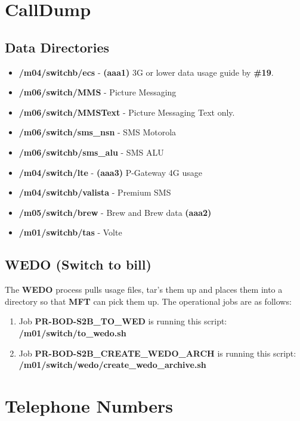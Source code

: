 \documentclass[12pt,twoside]{article}
\begin{document}
\section{CallDump}
\label{sec:orgheadline166}
\subsection{Data Directories}
\label{sec:orgheadline164}
\begin{itemize}
\item \textbf{/m04/switchb/ecs} - \textbf{(aaa1)} 3G or lower data usage guide by \textbf{\#19}.
\item \textbf{/m06/switch/MMS} - Picture Messaging
\item \textbf{/m06/switch/MMSText} - Picture Messaging Text only.
\item \textbf{/m06/switch/sms\_nsn} - SMS Motorola
\item \textbf{/m06/switchb/sms\_alu} - SMS ALU
\item \textbf{/m04/switch/lte} - \textbf{(aaa3)} P-Gateway 4G usage
\item \textbf{/m04/switchb/valista} - Premium SMS
\item \textbf{/m05/switch/brew} - Brew and Brew data \textbf{(aaa2)}
\item \textbf{/m01/switchb/tas} - Volte
\end{itemize}

\subsection{WEDO (Switch to bill)}
\label{sec:orgheadline165}
The \textbf{WEDO} process pulls usage files, tar's them up and places them
into a directory so that \textbf{MFT} can pick them up. The operational
jobs are as follows:

\begin{enumerate}
\item Job \textbf{PR-BOD-S2B\_TO\_WED} is running this script:
\textbf{/m01/switch/to\_wedo.sh}
\item Job \textbf{PR-BOD-S2B\_CREATE\_WEDO\_ARCH} is running this script:
\textbf{/m01/switch/wedo/create\_wedo\_archive.sh}
\end{enumerate}

\newpage
\section{Telephone Numbers}
\label{sec:orgheadline167}
\end{document}
